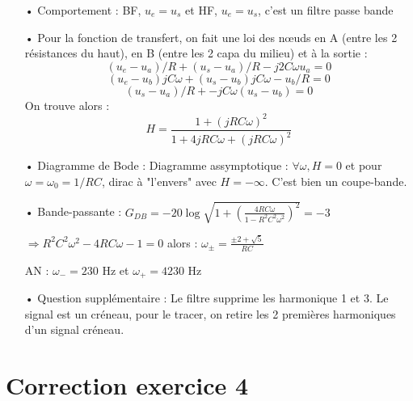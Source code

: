 \documentclass{report}
\begin{document}
\begin{itemize}
	\item[•] Comportement : BF, $u_e=u_s$ et HF, $u_e=u_s$, c'est un filtre passe bande
	
	\item[•]
		Pour la fonction de transfert, on fait une loi des nœuds en A (entre les 2 résistances du haut), en B (entre les 2 capa du milieu) et à la sortie :
	\begin{equation}
		(u_e-u_a)/R+(u_s-u_a)/R-j2C\omega u_a=0
	\end{equation}
	\begin{equation}
		(u_e-u_b)jC\omega+(u_s-u_b)jC\omega-u_b/R=0
	\end{equation}
	\begin{equation}
		(u_s-u_a)/R+-jC\omega(u_s-u_b)=0
	\end{equation}
	On trouve alors :
	\begin{equation}
		H =\frac{1+(jRC\omega)^2}{1+4jRC\omega + (jRC\omega)^2}
	\end{equation}
	
	\item[•]
	Diagramme de Bode :
Diagramme assymptotique :  $\forall \omega, H=0$ et pour $\omega=\omega_0=1/RC$, dirac à "l'envers" avec $H=-\infty$. C'est bien un coupe-bande.

	\item[•] Bande-passante :
	$G_{DB} = -20\log \sqrt{1+\left( \frac{4RC\omega}{1-R^2C^2\omega^2}\right) ^2}=-3$ 
	
	$\Rightarrow R^2C^2\omega^2 - 4RC\omega -1=0$
	alors : $\omega_{\pm}=\frac{\pm 2+\sqrt{5}}{RC}$
	
	AN : $\omega_- = 230$ Hz et $\omega_+ = 4230$ Hz
	
	\item[•] Question supplémentaire : 
	Le filtre supprime les harmonique 1 et 3. Le signal est un créneau, pour le tracer, on retire les 2 premières harmoniques d'un signal créneau.
\end{itemize}

\section*{Correction exercice 4}
\end{document}
